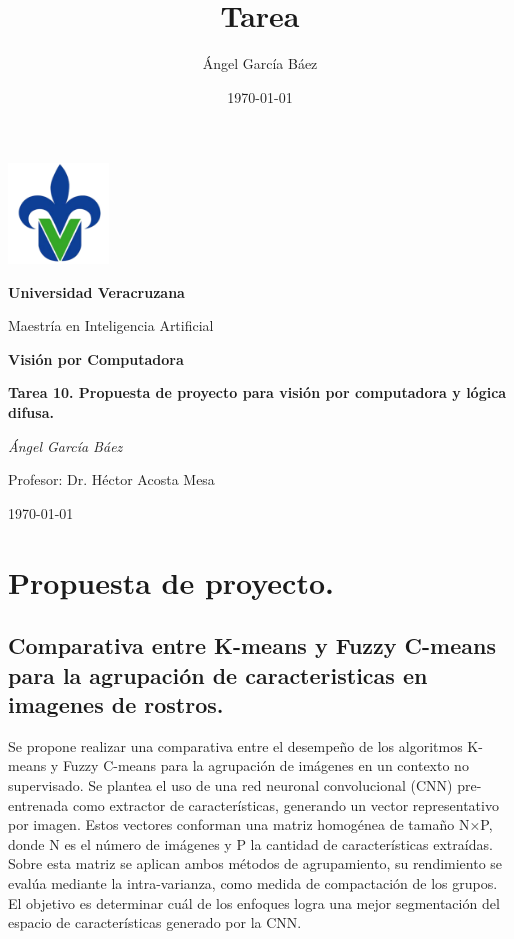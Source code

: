 \documentclass[11pt, letterpaper]{article}
\title{\bfseries Tarea}
\author{Ángel García Báez}
\date{\today}
\begin{document}
	
	\begin{titlepage}
		\centering
		\includegraphics[width=0.2\textwidth]{logo.png}\par
		\vspace{1cm}
		{\LARGE \bfseries Universidad Veracruzana \par}
		\vspace{1cm}
		{\Large Maestría en Inteligencia Artificial\par}
		\vspace{3cm}
		{\LARGE \bfseries Visión por Computadora \par}
		\vspace{1cm}
		{\Large \bfseries Tarea 10. Propuesta de proyecto para visión por computadora y lógica difusa. \par}
		\vfill
		{\Large \textit{Ángel García Báez}\par}
		\vspace{1cm}
		{\Large Profesor: Dr. Héctor Acosta Mesa \par}
		\vfill
		{\Large \today \par}
	\end{titlepage}
		
\section{Propuesta de proyecto.}
\subsection{Comparativa entre K-means y Fuzzy C-means para la agrupación de caracteristicas en imagenes de rostros.}


Se propone realizar una comparativa entre el desempeño de los algoritmos K-means y Fuzzy C-means para la agrupación de imágenes en un contexto no supervisado. Se plantea el uso de una red neuronal convolucional (CNN) pre-entrenada como extractor de características, generando un vector representativo por imagen. Estos vectores conforman una matriz homogénea de tamaño  N×P, donde N es el número de imágenes y P la cantidad de características extraídas. Sobre esta matriz se aplican ambos métodos de agrupamiento, su rendimiento se evalúa mediante la intra-varianza, como medida de compactación de los grupos. El objetivo es determinar cuál de los enfoques logra una mejor segmentación del espacio de características generado por la CNN.


	
	
	
\end{document}
